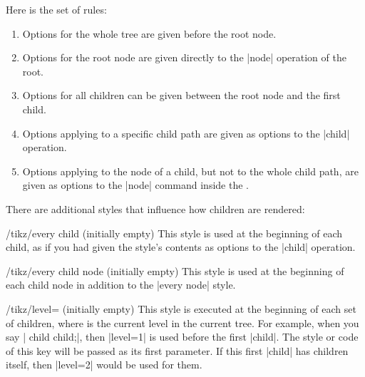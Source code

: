 Here is the set of rules:
%
\begin{enumerate}
    \item Options for the whole tree are given before the root node.
    \item Options for the root node are given directly to the |node| operation
        of the root.
    \item Options for all children can be given between the root node and the
        first child.
    \item Options applying to a specific child path are given as options to the
        |child| operation.
    \item Options applying to the node of a child, but not to the whole child
        path, are given as options to the |node| command inside the .
\end{enumerate}
%
\begin{codeexample}
\end{codeexample}

There are additional styles that influence how children are rendered:
%
\begin{stylekey}{/tikz/every child (initially \normalfont empty)}
    This style is used at the beginning of each child, as if you had given the
    style's contents as options to the |child| operation.
\end{stylekey}

\begin{stylekey}{/tikz/every child node (initially \normalfont empty)}
    This style is used at the beginning of each child node in addition to the
    |every node| style.
\end{stylekey}

\begin{stylekey}{/tikz/level= (initially \normalfont empty)}
    This style is executed at the beginning of each set of children, where
     is the current level in the current tree. For example, when
    you say | child child;|, then |level=1| is used before the first
    |child|. The style or code of this key will be passed  as its
    first parameter. If this first |child| has children itself, then |level=2|
    would be used for them.
\begin{codeexample}[]
\end{codeexample}
\end{stylekey}

